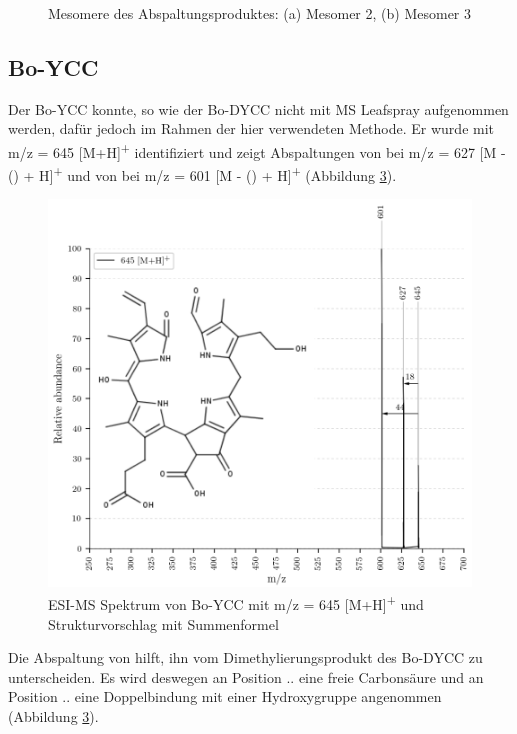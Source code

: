 \begin{figure}[!htbp]
\begin{subfigure}[b]{0.5\textwidth}
    \caption{}
    \label{fig:311MHMesomer3}
  \end{subfigure}
  \caption[2 Mesomere für potentielle Abspaltungsprodukte von Bo-DNCC, Quelle: Autor]{Mesomere des Abspaltungsproduktes: (a) Mesomer 2, (b) Mesomer 3}
\end{figure}

\pagebreak
\subsection{Bo-YCC}

Der Bo-YCC konnte, so wie der Bo-DYCC nicht mit MS Leafspray aufgenommen werden, dafür jedoch im Rahmen der hier verwendeten Methode. Er wurde mit m/z = 645 [M+H]\textsuperscript{+} identifiziert und zeigt Abspaltungen von  bei m/z = 627 [M - () + H]\textsuperscript{+} und von  bei m/z = 601 [M - () + H]\textsuperscript{+} (Abbildung \ref{fig:645MH}). 

\begin{figure}[!htbp]
  \centering
  \includegraphics[width=\textwidth, height=0.8\textwidth]{figures/Kapitel7/Kataboliten/VWA_MS_645-12.png}
  \caption[ESI-MS Spektrum von Bo-YCC, Quelle: Autor]{ESI-MS Spektrum von Bo-YCC mit m/z = 645 [M+H]\textsuperscript{+} und Strukturvorschlag mit Summenformel }
  \label{fig:645MH}
\end{figure}

Die Abspaltung von  hilft, ihn vom Dimethylierungsprodukt des Bo-DYCC zu unterscheiden. Es wird deswegen an Position .. eine freie Carbonsäure und an Position .. eine Doppelbindung mit einer Hydroxygruppe angenommen (Abbildung \ref{fig:645MH}).



